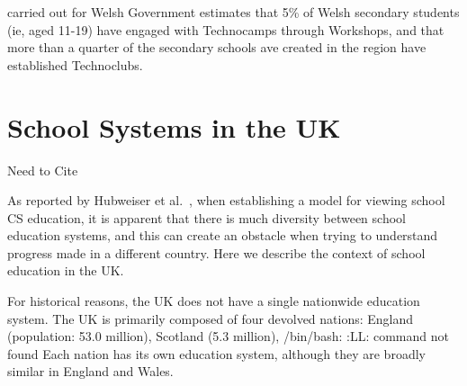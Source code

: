 \documentclass{sig-alternate}
\begin{document}
carried out for Welsh Government estimates that
5\% of Welsh secondary students (ie, aged 11-19)
have engaged with Technocamps through Workshops,
and that more than a quarter of the secondary schools
ave created in the region have established Technoclubs.

\section{School Systems in the UK}\label{sec:schools}

Need to Cite~\cite{Evans:2015}

As reported by Hubweiser et al.~\cite{hubwieser-et-al:2011}, when establishing a
model for viewing school CS education, it is apparent that there is
much diversity between school education systems, and this can create
an obstacle when trying to understand progress made in a different
country. Here we describe the context of school education in the UK.

For historical reasons, the UK does not have a single nationwide
education system.  The UK is primarily composed of four devolved
nations: England (population: 53.0 million), Scotland (5.3 million),
/bin/bash: :LL: command not found
Each nation has its own education system, although they are broadly
similar in England and Wales.


\end{document}
